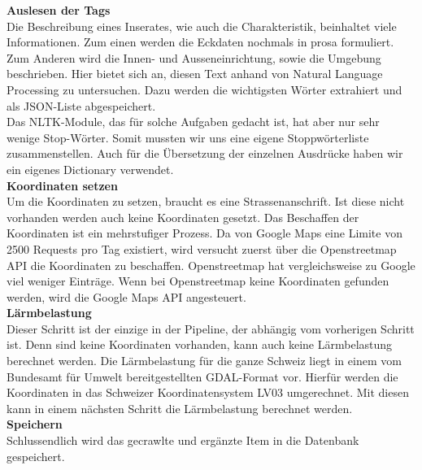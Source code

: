 %
\textbf{Auslesen der Tags}\\
Die Beschreibung eines Inserates, wie auch die Charakteristik, beinhaltet viele Informationen. Zum einen werden die Eckdaten nochmals in prosa formuliert. Zum Anderen wird die Innen- und Ausseneinrichtung, sowie die Umgebung beschrieben. Hier bietet sich an, diesen Text anhand von Natural Language Processing zu untersuchen. Dazu werden die wichtigsten Wörter extrahiert und als JSON-Liste abgespeichert.\\
Das NLTK-Module, das für solche Aufgaben gedacht ist, hat aber nur sehr wenige Stop-Wörter. Somit mussten wir uns eine eigene Stoppwörterliste zusammenstellen. Auch für die Übersetzung der einzelnen Ausdrücke haben wir ein eigenes Dictionary verwendet.\\[2ex]
%
\textbf{Koordinaten setzen}\\
Um die Koordinaten zu setzen, braucht es eine Strassenanschrift. Ist diese nicht vorhanden werden auch keine Koordinaten gesetzt. Das Beschaffen der Koordinaten ist ein mehrstufiger Prozess. Da von Google Maps eine Limite von 2500 Requests pro Tag existiert, wird versucht zuerst über die Openstreetmap API die Koordinaten zu beschaffen. Openstreetmap hat vergleichsweise zu Google viel weniger Einträge. Wenn bei Openstreetmap keine Koordinaten gefunden werden, wird die Google Maps API angesteuert.\\[2ex]
%
\textbf{Lärmbelastung}\\
Dieser Schritt ist der einzige in der Pipeline, der abhängig vom vorherigen Schritt ist. Denn sind keine Koordinaten vorhanden, kann auch keine Lärmbelastung berechnet werden. Die Lärmbelastung für die ganze Schweiz liegt in einem vom Bundesamt für Umwelt bereitgestellten GDAL-Format vor. Hierfür werden die Koordinaten in das Schweizer Koordinatensystem LV03 umgerechnet. Mit diesen kann in einem nächsten Schritt die Lärmbelastung berechnet werden.\\[2ex]
%
\textbf{Speichern}\\
Schlussendlich wird das gecrawlte und ergänzte Item in die Datenbank gespeichert.
%
%
